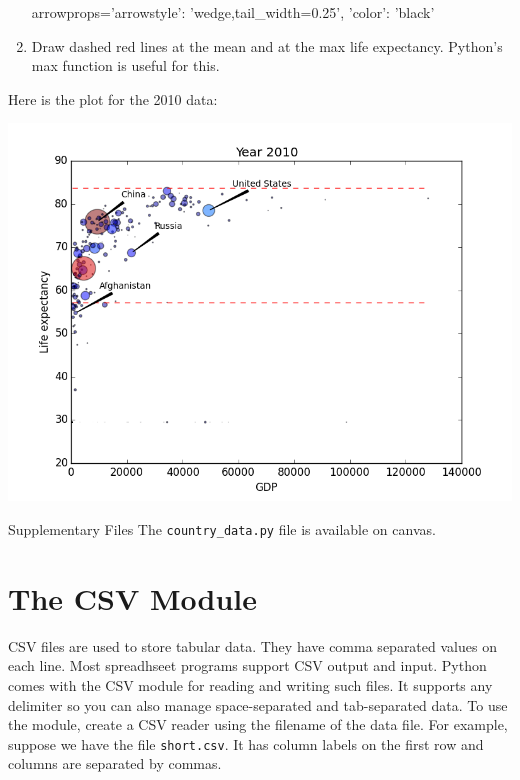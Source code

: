 \documentclass[11pt]{cselabheader}
\begin{document}
\begin{ex}[plotcountries.py]
\begin{enumerate}
\begin{python3code}
arrowprops={'arrowstyle': 'wedge,tail_width=0.25', 'color': 'black'}
\end{python3code}

\item Draw dashed red lines at the mean and at the max life expectancy.
Python's max function is useful for this.
\end{enumerate}

Here is the plot for the 2010 data:

\begin{center}
\includegraphics[width=\textwidth]{img/scatter_2010.png}
\end{center}
\end{ex}

\begin{infobox}{Supplementary Files}
The \texttt{country\_data.py} file is available on canvas.
\end{infobox}

\section{The CSV Module}
CSV files are used to store tabular data. They have comma separated values on
each line. Most spreadhseet programs support CSV output and input. Python comes
with the CSV module for reading and writing such files. It supports any
delimiter so you can also manage space-separated and tab-separated data. To
use the module, create a CSV reader using the filename of the data file. For
example, suppose we have the file \texttt{short.csv}. It has column labels
on the first row and columns are separated by commas.
\end{document}
